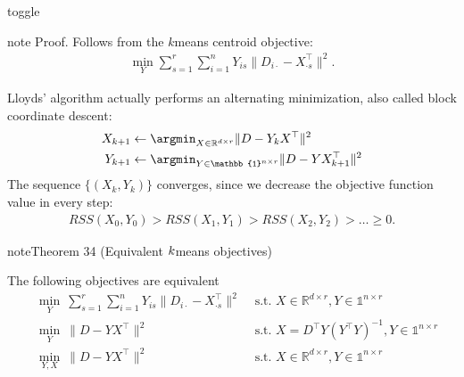 \documentclass[letterpaper,10pt,english]{jupyterBook}
\begin{document}
\begin{sphinxuseclass}{toggle}
\begin{sphinxadmonition}{note}
\sphinxAtStartPar
Proof.     Follows from the \(k\)\sphinxhyphen{}means centroid objective:
\begin{equation*}
\begin{split}\min_Y\sum_{s=1}^r\sum_{i=1}^n Y_{is}\lVert D_{i\cdot} - X_{\cdot s}^\top\rVert^2.\end{split}
\end{equation*}
\end{sphinxadmonition}

\end{sphinxuseclass}
\sphinxAtStartPar
Lloyds’ algorithm actually performs an alternating minimization, also called block coordinate descent:
\label{equation:clustering_k_means_mf:6fc483bb-b4fa-4d5a-80a6-dbf9237e59a5}\begin{align}
    X_{k+1} & \leftarrow \argmin_{X\in\mathbb{R}^{d\times r}}\lVert D-Y_kX^\top\rVert^2\\
    Y_{k+1} &\leftarrow \argmin_{Y\in \mathbb{1}^{n\times r}}\lVert D-YX_{k+1}^\top\rVert^2
\end{align}
\sphinxAtStartPar
The sequence \(\{(X_k,Y_k)\}\) converges, since we decrease the objective function value in every step:
\begin{equation*}
\begin{split}RSS(X_0,Y_0)>RSS(X_1,Y_1)>RSS(X_2,Y_2)>\ldots \geq 0 .\end{split}
\end{equation*}
\label{clustering_k_means_mf:theorem-4}
\begin{sphinxadmonition}{note}{Theorem 34 (Equivalent \protect\(k\protect\)\sphinxhyphen{}means objectives)}



\sphinxAtStartPar
The following objectives are equivalent
\label{equation:clustering_k_means_mf:98367704-6092-48f6-8a49-ad377624ea60}\begin{align}
&\min_{Y}\ \sum_{s=1}^r\sum_{i=1}^nY_{is}\|D_{i\cdot}-X_{\cdot s}^\top\|^2 &\text{ s.t. } X\in\mathbb{R}^{d\times r}, Y\in\mathbb{1}^{n\times r}\\ 
&\min_{Y}\ \|D-YX^\top\|^2 &\text{ s.t. } X= D^\top Y(Y^\top Y)^{-1}, Y\in\mathbb{1}^{n\times r} \\
&\min_{Y,X}\ \|D-YX^\top\|^2 &\text{ s.t. }  X\in\mathbb{R}^{d\times r},Y\in\mathbb{1}^{n\times r} 
\end{align}\end{sphinxadmonition}
\end{document}
